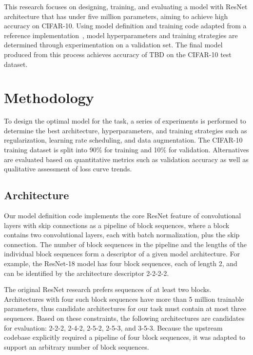 \documentclass[letterpaper]{article} %
\begin{document}
This research focuses on designing, training, and evaluating a model with ResNet architecture that has under five
million parameters, aiming to achieve high accuracy on CIFAR-10.
Using model definition and training code adapted from a reference implementation~\cite{kl:2021}, model
hyperparameters and training strategies are determined through experimentation on a validation set.
The final model produced from this process achieves accuracy of TBD on the CIFAR-10 test dataset.

\section{Methodology}

To design the optimal model for the task, a series of experiments is performed to determine the best architecture,
hyperparameters, and training strategies such as regularization, learning rate scheduling, and data augmentation.
The CIFAR-10 training dataset is split into 90\% for training and 10\% for validation.
Alternatives are evaluated based on quantitative metrics such as validation accuracy as well as qualitative assessment
of loss curve trends.

\subsection{Architecture}

Our model definition code implements the core ResNet feature of convolutional layers with skip connections as a
pipeline of block sequences, where a block contains two convolutional layers, each with batch normalization, plus the
skip connection.
The number of block sequences in the pipeline and the lengths of the individual block sequences form a descriptor of a
given model architecture.
For example, the ResNet-18 model has four block sequences, each of length 2, and can be identified by the architecture
descriptor 2-2-2-2.

The original ResNet research prefers sequences of at least two blocks.
Architectures with four such block sequences have more than 5 million trainable parameters, thus candidate
architectures for our task must contain at most three sequences.
Based on these constraints, the following architectures are candidates for evaluation: 2-2-2, 2-4-2, 2-5-2, 2-5-3,
and 3-5-3.
Because the upstream codebase explicitly required a pipeline of four block sequences, it was adapted to support an
arbitrary number of block sequences.
\end{document}
